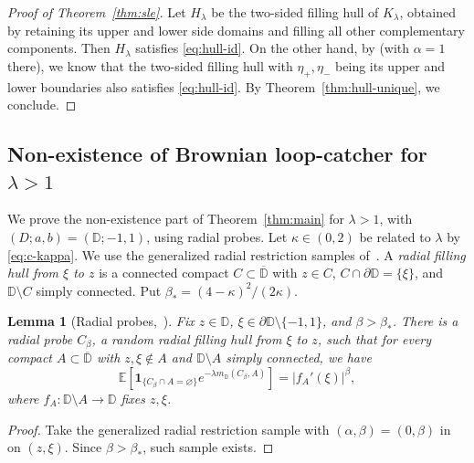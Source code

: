 \documentclass[11pt]{article}
\numberwithin{equation}{section}
\newcommand{\D}{\mathbb{D}}
\newcommand{\E}{\mathbb{E}}
\newcommand{\1}{\mathbf{1}}
\newtheorem{lemma}[theorem]{Lemma}
\newcommand\ol[1]{\overline{#1}}
\newcommand{\one}{\mathbf 1}
\begin{document}
\begin{proof}[Proof of Theorem~\ref{thm:sle}]
Let \(H_\lambda\) be the two-sided filling hull of \(K_\lambda\), obtained by
retaining its upper and lower side domains and filling all other
complementary components.  
Then \(H_\lambda\) satisfies \eqref{eq:hull-id}.
On the other hand, by \cite[Proposition~6.2]{qian2021generalized} (with $\alpha=1$ there), we know that the two-sided filling hull with $\eta_+,\eta_-$ being its upper and lower boundaries also satisfies \eqref{eq:hull-id}. By Theorem~\ref{thm:hull-unique}, we conclude.
\end{proof}





\subsection{Non-existence of Brownian loop-catcher for \texorpdfstring{$\lambda>1$}{lambda > 1}}
\label{subsec:sec5-non-existence}

We prove the non-existence part of Theorem~\ref{thm:main} for
\(\lambda>1\), with \((D;a,b)=(\D;-1,1)\), using radial probes. Let
\(\kappa\in(0,2)\) be related to \(\lambda\) by \eqref{eq:c-kappa}.
We use the generalized radial restriction samples of~\cite{qian2021generalized}.
A \emph{radial filling hull from \(\xi\) to \(z\)} is a connected compact
\(C\subset\ol\D\) with \(z\in C\),
\(C\cap\partial\D=\{\xi\}\), and \(\D\setminus C\) simply connected.
Put \(\beta_*=(4-\kappa)^2/(2\kappa)\).

\begin{lemma}[Radial probes,~\cite{qian2021generalized}]
\label{lem:sec5-positive-radial-probes}
Fix \(z\in\D\), \(\xi\in\partial\D\setminus\{-1,1\}\), and
\(\beta>\beta_*\).  There is a radial probe \(C_\beta\), a random radial
filling hull from \(\xi\) to \(z\), such that for every compact \(A\subset\ol\D\) with \(z,\xi\notin A\) and
\(\D\setminus A\) simply connected, we have
\begin{equation}\label{eq:sec5-positive-radial-transform}
 \E\!\left[
 \one_{\{C_\beta\cap A=\varnothing\}}
 e^{-\lambda m_\D(C_\beta,A)}\right]=|f_A'(\xi)|^\beta,
\end{equation}
where \(f_A:\D\setminus A\to\D\) fixes \(z,\xi\).
\end{lemma}
\begin{proof}
Take the generalized radial restriction sample with
\((\alpha,\beta)=(0,\beta)\) in~\cite[Theorem~1.6]{qian2021generalized} on $(z,\xi)$. Since $\beta>\beta_*$, such sample exists.
\end{proof}
\end{document}
